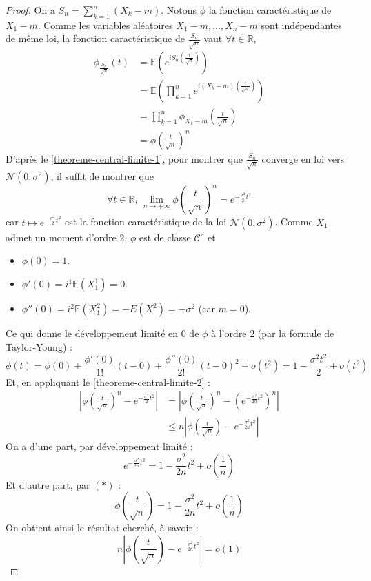   \begin{proof}
    On a $S_n = \sum_{k=1}^n (X_k - m)$. Notons $\phi$ la fonction caractéristique de $X_1 - m$. Comme les variables aléatoires $X_1 - m, \dots, X_n - m$ sont indépendantes de même loi, la fonction caractéristique de $\frac{S_n}{\sqrt{n}}$ vaut $\forall t \in \mathbb{R}$,
    \begin{align*}
      \phi_{\frac{S_n}{\sqrt{n}}}(t) &= \mathbb{E} \left( e^{iS_n \left( \frac{t}{\sqrt{n}} \right)} \right) \\
      &= \mathbb{E} \left( \prod_{k=1}^n e^{i(X_k -m) \left( \frac{t}{\sqrt{n}} \right)} \right) \\
      &= \prod_{k=1}^n \phi_{X_k - m} \left ( \frac{t}{\sqrt{n}} \right) \\
      &= \phi \left ( \frac{t}{\sqrt{n}} \right)^n
    \end{align*}
    D'après le \cref{theoreme-central-limite-1}, pour montrer que $\frac{S_n}{\sqrt{n}}$ converge en loi vers $\mathcal{N}(0, \sigma^2)$, il suffit de montrer que
    \[ \forall t \in \mathbb{R}, \, \lim_{n \rightarrow +\infty} \phi \left ( \frac{t}{\sqrt{n}} \right)^n = e^{-\frac{\sigma^2}{2} t^2} \]
    car $t \mapsto e^{-\frac{\sigma^2}{2} t^2}$ est la fonction caractéristique de la loi $\mathcal{N}(0, \sigma^2)$.
    \newpar
    Comme $X_1$ admet un moment d'ordre $2$, $\phi$ est de classe $\mathcal{C}^2$ et
    \begin{itemize}
      \item $\phi(0) = 1$.
      \item $\phi'(0) = i^1 \mathbb{E}(X_1^1) = 0$.
      \item $\phi''(0) = i^2 \mathbb{E}(X_1^2) = - E(X^2) = -\sigma^2$ (car $m = 0$).
    \end{itemize}
    Ce qui donne le développement limité en $0$ de $\phi$ à l'ordre $2$ (par la formule de Taylor-Young) :
    \[ \phi(t) = \phi(0) + \frac{\phi'(0)}{1!} (t-0) + \frac{\phi''(0)}{2!} (t-0)^2 + o(t^2) = 1 - \frac{\sigma^2 t^2}{2} + o(t^2) \tag{$*$} \]
    Et, en appliquant le \cref{theoreme-central-limite-2} :
    \begin{align*}
      \left | \phi \left ( \frac{t}{\sqrt{n}} \right)^n - e^{-\frac{\sigma^2}{2} t^2} \right | &= \left | \phi \left ( \frac{t}{\sqrt{n}} \right)^n - \left( e^{- \frac{\sigma^2}{2n} t^2} \right)^n \right | \\
      &\leq n \left | \phi \left ( \frac{t}{\sqrt{n}} \right) - e^{-\frac{\sigma^2}{2n} t^2} \right |
    \end{align*}
    \[  \]
    On a d'une part, par développement limité :
    \[ e^{-\frac{\sigma^2}{2n} t^2} = 1 - \frac{\sigma^2}{2n} t^2 + o \left ( \frac{1}{n} \right) \]
    Et d'autre part, par $(*)$ :
    \[ \phi \left ( \frac{t}{\sqrt{n}} \right) = 1 - \frac{\sigma^2}{2n}t^2 + o \left ( \frac{1}{n} \right ) \]
    On obtient ainsi le résultat cherché, à savoir :
    \[ n \left | \phi \left ( \frac{t}{\sqrt{n}} \right) - e^{-\frac{\sigma^2}{2n} t^2} \right | = o (1) \]
  \end{proof}

